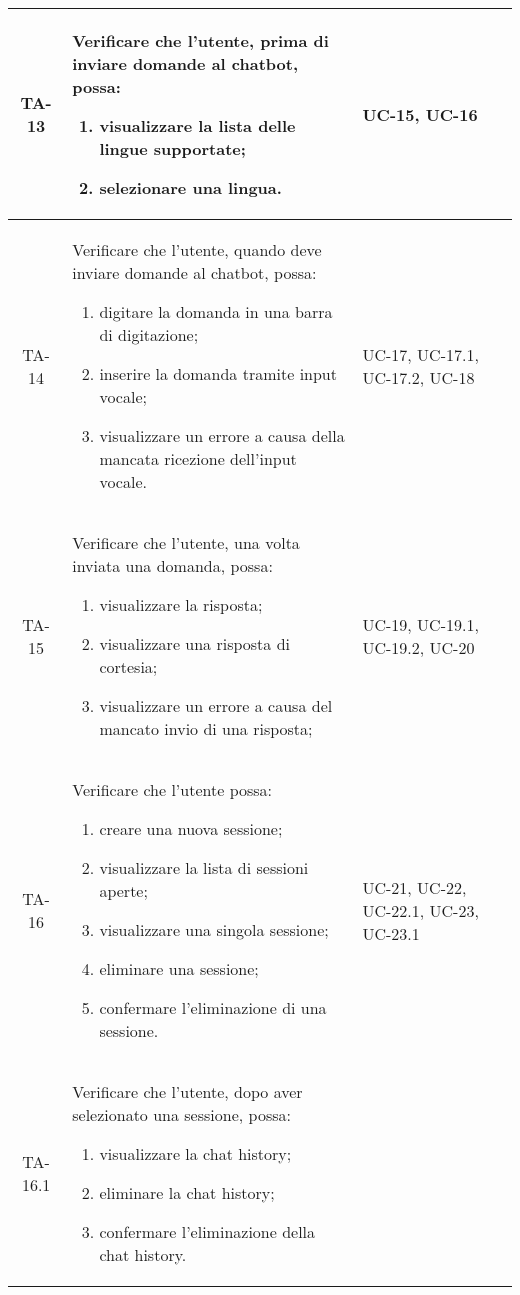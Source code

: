 \begin{xltabular}{\textwidth}{| c | X | X | c |}
    TA-13 & Verificare che l’utente, prima di inviare domande al chatbot, possa:
    \begin{enumerate}
        \item visualizzare la lista delle lingue supportate;
        \item selezionare una lingua.
        
    \end{enumerate}& UC-15, UC-16 &  \\
    \hline

    TA-14 & Verificare che l’utente, quando deve inviare domande al chatbot, possa:
    \begin{enumerate}
        \item digitare la domanda in una barra di digitazione;
        \item inserire la domanda tramite input vocale;
        \item visualizzare un errore a causa della mancata ricezione dell'input vocale.
        
    \end{enumerate}& UC-17, UC-17.1, UC-17.2, UC-18 &  \\
    \hline
    TA-15 & Verificare che l’utente, una volta inviata una domanda, possa:
    \begin{enumerate}
        \item visualizzare la risposta;
        \item visualizzare una risposta di cortesia;
        \item visualizzare un errore a causa del mancato invio di una risposta;

    
        
    \end{enumerate}& UC-19, UC-19.1, UC-19.2, UC-20&  \\
    \hline
     TA-16 & Verificare che l’utente possa:
    \begin{enumerate}
        \item creare una nuova sessione;
        \item visualizzare la lista di sessioni aperte;
        \item visualizzare una singola sessione;
        \item eliminare una sessione;
        \item confermare l'eliminazione di una sessione.
        
        
    \end{enumerate}& UC-21, UC-22, UC-22.1, UC-23, UC-23.1 &  \\
    \hline
    TA-16.1 & Verificare che l'utente, dopo aver selezionato una sessione, possa:
    \begin{enumerate}
        \item visualizzare la chat history;
        \item eliminare la chat history;
        \item confermare l'eliminazione della chat history.
        

\end{enumerate}
\end{xltabular}
